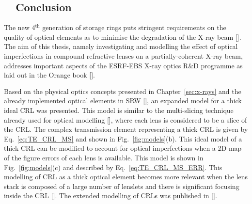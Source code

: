 
\begin{refsection}\renewcommand{\thechapter}{7.en}
\chapter{~~Conclusion}\label{sec:conclusion_en}

The new 4$^\text{th}$ generation of storage rings puts stringent requirements on the quality of optical elements as to minimise the degradation of the X-ray beam [\cite{Schroer2014,Yabashi2014}]. The aim of this thesis, namely investigating and modelling the effect of optical imperfections in compound refractive lenses on a partially-coherent X-ray beam, addresses important aspects of the ESRF-EBS X-ray optics R$\&$D programme as laid out in the Orange book [\cite{orangebook}]. 

Based on the physical optics concepts presented in Chapter~\ref{sec:x-rays} and the already implemented optical elements in SRW [\cite{Baltser2011}], an expanded model for a thick ideal CRL was presented. This model is similar to the multi-slicing technique already used for optical modelling [\cite{Li2017,Ali2020}], where each lens is considered to be a slice of the CRL. The complex transmission element representing a thick CRL is given by Eq.~\ref{eq:TE_CRL_MS} and shown in Fig.~\ref{fig:models}(b). This ideal model of a thick CRL can be modified to account for optical imperfections when a 2D map of the figure errors of each lens is available. This model is shown in Fig.~\ref{fig:models}(c) and described by Eq.~\ref{eq:TE_CRL_MS_ERR}. This modelling of CRL as a thick optical element becomes more relevant when the lens stack is composed of a large number of lenslets and there is significant focusing inside the CRL [\cite{Schroer2005}]. The extended modelling of CRLs was published in [\cite{Celestre2020}].


\end{refsection}
